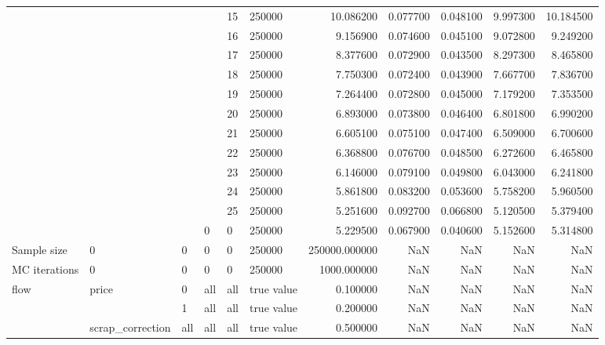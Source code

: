 \begin{tabular}{llllllrrrrr}
\cline{5-11}
 &  &  &  & 15 & 250000 & 10.086200 & 0.077700 & 0.048100 & 9.997300 & 10.184500 \\
\cline{5-11}
 &  &  &  & 16 & 250000 & 9.156900 & 0.074600 & 0.045100 & 9.072800 & 9.249200 \\
\cline{5-11}
 &  &  &  & 17 & 250000 & 8.377600 & 0.072900 & 0.043500 & 8.297300 & 8.465800 \\
\cline{5-11}
 &  &  &  & 18 & 250000 & 7.750300 & 0.072400 & 0.043900 & 7.667700 & 7.836700 \\
\cline{5-11}
 &  &  &  & 19 & 250000 & 7.264400 & 0.072800 & 0.045000 & 7.179200 & 7.353500 \\
\cline{5-11}
 &  &  &  & 20 & 250000 & 6.893000 & 0.073800 & 0.046400 & 6.801800 & 6.990200 \\
\cline{5-11}
 &  &  &  & 21 & 250000 & 6.605100 & 0.075100 & 0.047400 & 6.509000 & 6.700600 \\
\cline{5-11}
 &  &  &  & 22 & 250000 & 6.368800 & 0.076700 & 0.048500 & 6.272600 & 6.465800 \\
\cline{5-11}
 &  &  &  & 23 & 250000 & 6.146000 & 0.079100 & 0.049800 & 6.043000 & 6.241800 \\
\cline{5-11}
 &  &  &  & 24 & 250000 & 5.861800 & 0.083200 & 0.053600 & 5.758200 & 5.960500 \\
\cline{5-11}
 &  &  &  & 25 & 250000 & 5.251600 & 0.092700 & 0.066800 & 5.120500 & 5.379400 \\
\cline{4-11} \cline{5-11}
 &  &  & 0 & 0 & 250000 & 5.229500 & 0.067900 & 0.040600 & 5.152600 & 5.314800 \\
\cline{1-11} \cline{2-11} \cline{3-11} \cline{4-11} \cline{5-11}
Sample size & 0 & 0 & 0 & 0 & 250000 & 250000.000000 & NaN & NaN & NaN & NaN \\
\cline{1-11} \cline{2-11} \cline{3-11} \cline{4-11} \cline{5-11}
MC iterations & 0 & 0 & 0 & 0 & 250000 & 1000.000000 & NaN & NaN & NaN & NaN \\
\cline{1-11} \cline{2-11} \cline{3-11} \cline{4-11} \cline{5-11}
\multirow[t]{37}{*}{flow} & \multirow[t]{2}{*}{price} & 0 & all & all & true value & 0.100000 & NaN & NaN & NaN & NaN \\
\cline{3-11} \cline{4-11} \cline{5-11}
 &  & 1 & all & all & true value & 0.200000 & NaN & NaN & NaN & NaN \\
\cline{2-11} \cline{3-11} \cline{4-11} \cline{5-11}
 & scrap_correction & all & all & all & true value & 0.500000 & NaN & NaN & NaN & NaN \\
\cline{2-11} \cline{3-11} \cline{4-11} \cline{5-11}

\end{tabular}
